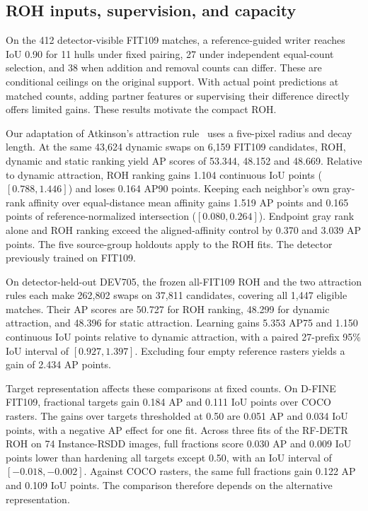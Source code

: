 \documentclass[journal]{IEEEtran}
\begin{document}
\subsection{ROH inputs, supervision, and capacity}

On the 412 detector-visible FIT109 matches, a reference-guided writer reaches IoU 0.90 for 11 hulls under fixed pairing, 27 under independent equal-count selection, and 38 when addition and removal counts can differ. These are conditional ceilings on the original support. With actual point predictions at matched counts, adding partner features or supervising their difference directly offers limited gains. These results motivate the compact ROH.

Our adaptation of Atkinson's attraction rule~\cite{atkinson} uses a five-pixel radius and decay length. At the same 43,624 dynamic swaps on 6,159 FIT109 candidates, ROH, dynamic and static ranking yield AP scores of 53.344, 48.152 and 48.669. Relative to dynamic attraction, ROH ranking gains 1.104 continuous IoU points (\([0.788,1.446]\)) and loses 0.164 AP90 points. Keeping each neighbor's own gray-rank affinity over equal-distance mean affinity gains 1.519 AP points and 0.165 points of reference-normalized intersection (\([0.080,0.264]\)). Endpoint gray rank alone and ROH ranking exceed the aligned-affinity control by 0.370 and 3.039 AP points. The five source-group holdouts apply to the ROH fits. The detector previously trained on FIT109.

On detector-held-out DEV705, the frozen all-FIT109 ROH and the two attraction rules each make 262,802 swaps on 37,811 candidates, covering all 1,447 eligible matches. Their AP scores are 50.727 for ROH ranking, 48.299 for dynamic attraction, and 48.396 for static attraction. Learning gains 5.353 AP75 and 1.150 continuous IoU points relative to dynamic attraction, with a paired 27-prefix 95\% IoU interval of \([0.927,1.397]\). Excluding four empty reference rasters yields a gain of 2.434 AP points.

Target representation affects these comparisons at fixed counts. On D-FINE FIT109, fractional targets gain 0.184 AP and 0.111 IoU points over COCO rasters. The gains over targets thresholded at 0.50 are 0.051 AP and 0.034 IoU points, with a negative AP effect for one fit. Across three fits of the RF-DETR ROH on 74 Instance-RSDD images, full fractions score 0.030 AP and 0.009 IoU points lower than hardening all targets except 0.50, with an IoU interval of \([-0.018,-0.002]\). Against COCO rasters, the same full fractions gain 0.122 AP and 0.109 IoU points. The comparison therefore depends on the alternative representation.
\end{document}
